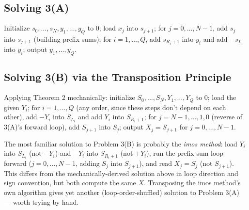 \documentclass[11pt]{article}
\begin{document}
\subsection{Solving 3(A)}
Initialize $s_0,\ldots,s_N,y_1,\ldots,y_Q$ to $0$; load $x_j$ into
$s_{j+1}$; for $j=0,\ldots,N-1$, add $s_j$ into $s_{j+1}$ (building
prefix sums); for $i=1,\ldots,Q$, add $s_{R_i+1}$ into $y_i$ and add
$-s_{L_i}$ into $y_i$; output $y_1,\ldots,y_Q$.

\subsection{Solving 3(B) via the Transposition Principle}
Applying Theorem 2 mechanically: initialize $S_0,\ldots,S_N,Y_1,\ldots,
Y_Q$ to $0$; load the given $Y_i$; for $i=1,\ldots,Q$ (any order, since
these steps don't depend on each other), add $-Y_i$ into $S_{L_i}$ and
add $Y_i$ into $S_{R_i+1}$; for $j=N-1,\ldots,1,0$ (reverse of 3(A)'s
forward loop), add $S_{j+1}$ into $S_j$; output $X_j=S_{j+1}$ for
$j=0,\ldots,N-1$.

\begin{notebox}
The most familiar solution to Problem 3(B) is probably the \emph{imos
method}: load $Y_i$ into $S_{L_i}$ (not $-Y_i$) and $-Y_i$ into
$S_{R_i+1}$ (not $+Y_i$), run the prefix-sum loop forward
($j=0,\ldots,N-1$, adding $S_j$ into $S_{j+1}$), and read
$X_j=S_j$ (not $S_{j+1}$). This differs from the mechanically-derived
solution above in loop direction and sign convention, but both compute
the same $X$. Transposing the imos method's own algorithm gives yet
another (loop-order-shuffled) solution to Problem 3(A) --- worth
trying by hand.
\end{notebox}
\end{document}
